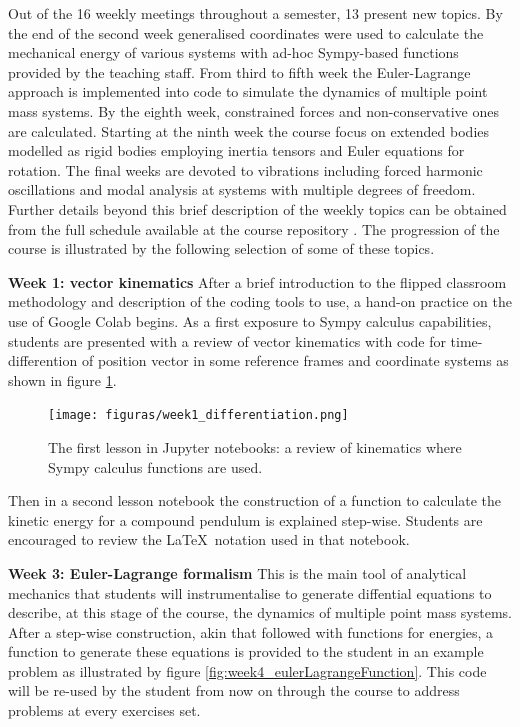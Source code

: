 Out of the 16 weekly meetings throughout a semester, 13 present new topics.
By the end of the second week generalised coordinates were used to calculate the mechanical energy of various systems with ad-hoc Sympy-based functions provided by the teaching staff.
From third to fifth week the Euler-Lagrange approach is implemented into code to simulate the dynamics of multiple point mass systems.
By the eighth week, constrained forces and non-conservative ones are calculated.
Starting at the ninth week the course focus on extended bodies modelled as rigid bodies employing inertia tensors and Euler equations for rotation.
The final weeks are devoted to vibrations including forced harmonic oscillations and modal analysis at systems with multiple degrees of freedom.
Further details beyond this brief description of the weekly topics can be obtained from the full schedule available at the course repository \cite{repositorio-victor}.
The progression of the course is illustrated by the following selection of some of these topics.


\textbf{Week 1: vector kinematics}
After a brief introduction to the flipped classroom methodology and description of the coding tools to use, a hand-on practice on the use of Google Colab begins.
As a first exposure to Sympy calculus capabilities, students are presented with a review of vector kinematics with code for time-differention of position vector in some reference frames and coordinate systems as shown in figure \ref{fig:week1_differentiation}.

\begin{figure}[!ht]
    \centering
    \texttt{[image: figuras/week1\_differentiation.png]}
    \caption{The first lesson in Jupyter notebooks: a review of kinematics where Sympy calculus functions are used.}
    \label{fig:week1_differentiation}
\end{figure}

Then in a second lesson notebook the construction of a function to calculate the kinetic energy for a compound pendulum is explained step-wise. 
Students are encouraged to review the \LaTeX\ notation used in that notebook.


\textbf{Week 3: Euler-Lagrange formalism}
This is the main tool of analytical mechanics that students will instrumentalise to generate diffential equations to describe, at this stage of the course, the dynamics of multiple point mass systems.
After a step-wise construction, akin that followed with functions for energies, a function to generate these equations is provided to the student in an example problem as illustrated by figure \ref{fig:week4_eulerLagrangeFunction}.
This code will be re-used by the student from now on through the course to address problems at every exercises set.

